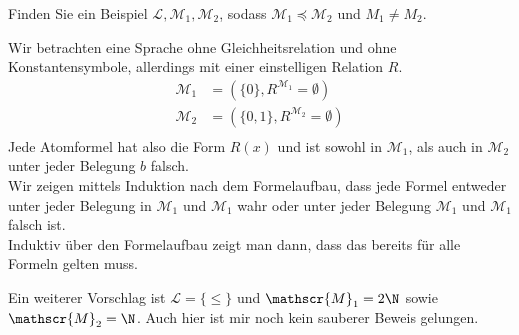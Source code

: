 
\begin{exercise}[143]
Finden Sie ein Beispiel $\mathscr{L},\mathscr{M}_1,\mathscr{M}_2$, sodass
$\mathscr{M}_1 \preccurlyeq \mathscr{M}_2$ und $M_1 \neq M_2$.
\end{exercise}


\begin{solution}
Wir betrachten eine Sprache ohne Gleichheitsrelation und ohne Konstantensymbole, allerdings
mit einer einstelligen Relation $R$.
\begin{align*}
  \mathscr{M}_1 &= (\{0\}, R^{\mathscr{M}_1}= \emptyset) \\
  \mathscr{M}_2 &= (\{0,1\}, R^{\mathscr{M}_2}= \emptyset) \\
\end{align*}
Jede Atomformel hat also die Form $R(x)$ und ist sowohl in $\mathscr{M}_1$,
als auch in $\mathscr{M}_2$ unter jeder Belegung $b$ falsch. \\
Wir zeigen mittels Induktion nach dem Formelaufbau, dass jede Formel
entweder unter jeder Belegung in $\mathscr{M}_1$ und $\mathscr{M}_1$ wahr oder
unter jeder Belegung $\mathscr{M}_1$ und $\mathscr{M}_1$ falsch ist. \\
Induktiv über den Formelaufbau zeigt man dann, dass das bereits für alle Formeln gelten muss.
\end{solution}


\begin{solution}
	Ein weiterer Vorschlag ist $\mathscr{L} = \{\leq\}$ und $\mathscr{M}_1 = 2\N$ sowie $\mathscr{M}_2 = \N$. Auch hier ist mir noch kein sauberer Beweis gelungen.
\end{solution}
